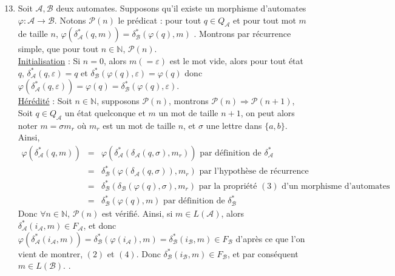 \documentclass{article}
\newcommand{\bb}[1]{\mathbb{#1}}
\begin{document}
\begin{enumerate}
    \setcounter{enumi}{12}

    \item \label{itm:rec1} Soit $\mathcal{A}, \mathcal{B}$ deux automates. Supposons qu'il existe un morphisme d'automates $\varphi : \mathcal{A} \rightarrow \mathcal{B}$. \newline
    Notons $\mathcal{P}(n)$ le prédicat : \og pour tout $q \in Q_\mathcal{A}$ et pour tout mot $m$ de taille $n$, $\varphi(\delta_\mathcal{A}^*(q, m)) = \delta_\mathcal{B}^*(\varphi(q), m)$ \fg. Montrons par récurrence simple, que pour tout $n \in \bb{N}$, $\mathcal{P}(n)$. \\[2mm] 
    \underline{Initialisation} : Si $n = 0$, alors $m (= \varepsilon)$ est le mot vide, alors pour tout état $q$, \newline
    $\delta_\mathcal{A}^*(q, \varepsilon) = q$ et $\delta_\mathcal{B}^*(\varphi(q), \varepsilon) = \varphi(q)$ donc $\varphi(\delta_\mathcal{A}^*(q, \varepsilon)) = \varphi(q) = \delta_\mathcal{B}^*(\varphi(q), \varepsilon)$. \\[2mm]
    \underline{Hérédité} : Soit $n \in \bb{N}$, supposons $\mathcal{P}(n)$, montrons $\mathcal{P}(n) \Rightarrow \mathcal{P}(n + 1)$, \newline
    Soit $q \in Q_\mathcal{A}$ un état quelconque et $m$ un mot de taille $n + 1$, on peut alors noter $m = \sigma m_r$ où $m_r$ est un mot de taille $n$, et $\sigma$ une lettre dans $\{a, b\}$. Ainsi, \begin{eqnarray*}
        \varphi(\delta_\mathcal{A}^*(q, m)) & = & \varphi(\delta_\mathcal{A}^*(\delta_\mathcal{A}(q, \sigma), m_r)) \text{ par définition de } \delta^*_\mathcal{A} \\
        & = & \delta_\mathcal{B}^*(\varphi(\delta_\mathcal{A}(q, \sigma)), m_r) \text{ par l'hypothèse de récurrence} \\
        & = & \delta_\mathcal{B}^*(\delta_\mathcal{B}(\varphi(q), \sigma), m_r) \text{ par la propriété $(3)$ d'un morphisme d'automates} \\
        & = & \delta_\mathcal{B}^*(\varphi(q), m) \text{ par définition de } \delta^*_\mathcal{B} 
    \end{eqnarray*}
    Donc $\forall n \in \bb{N}$, $\mathcal{P}(n)$ est vérifié. \newline 
    Ainsi, si $m \in L(\mathcal{A})$, alors $\delta^*_\mathcal{A}(i_\mathcal{A}, m) \in F_\mathcal{A}$, et donc $\varphi(\delta^*_\mathcal{A}(i_\mathcal{A}, m)) = \delta_\mathcal{B}^*(\varphi(i_\mathcal{A}), m)  = \delta_\mathcal{B}^*(i_\mathcal{B}, m) \in F_\mathcal{B}$ d'après ce que l'on vient de montrer, $(2)$ et $(4)$. Donc $\delta^*_\mathcal{B}(i_\mathcal{B}, m) \in F_\mathcal{B}$, et par conséquent $m \in L(\mathcal{B})$. .

\end{enumerate}
\end{document}
